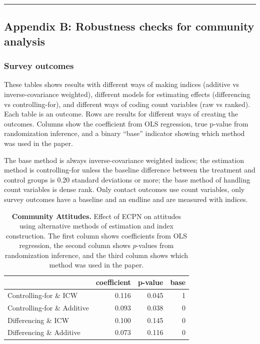 \documentclass[
]{article}
\begin{document}
\begin{center}\rule{0.5\linewidth}{0.5pt}\end{center}

\hypertarget{appendix-b-robustness-checks-for-community-analysis}{%
\subsection{Appendix B: Robustness checks for community
analysis}\label{appendix-b-robustness-checks-for-community-analysis}}

\hypertarget{survey-outcomes}{%
\subsubsection{Survey outcomes}\label{survey-outcomes}}

These tables shows results with different ways of making indices
(additive vs inverse-covariance weighted), different models for
estimating effects (differencing vs controlling-for), and different ways
of coding count variables (raw vs ranked). Each table is an outcome.
Rows are results for different ways of creating the outcomes. Columns
show the coefficient from OLS regression, true p-value from
randomization inference, and a binary ``base'' indicator showing which
method was used in the paper.

The base method is always inverse-covariance weighted indices; the
estimation method is controlling-for unless the baseline difference
between the treatment and control groups is 0.20 standard deviations or
more; the base method of handling count variables is dense rank. Only
contact outcomes use count variables, only survey outcomes have a
baseline and an endline and are measured with indices.

\begin{table}[H]
\begin{center}
\label{tab:attitude_tab}
\caption{\textbf{Community Attitudes.} Effect of ECPN on attitudes using alternative methods of estimation and index construction. The first column shows coefficients from OLS regression, the second column shows $p$-values from randomization inference, and the third column shows which method was used in the paper.}
\smallskip

\begin{tabular}{l|r|r|r}
\hline
  & coefficient & p-value & base\\
\hline
Controlling-for \& ICW & 0.116 & 0.045 & 1\\
\hline
Controlling-for \& Additive & 0.093 & 0.038 & 0\\
\hline
Differencing \& ICW & 0.100 & 0.145 & 0\\
\hline
Differencing \& Additive & 0.073 & 0.116 & 0\\
\hline
\end{tabular}


\end{center}
\end{table}
\end{document}
